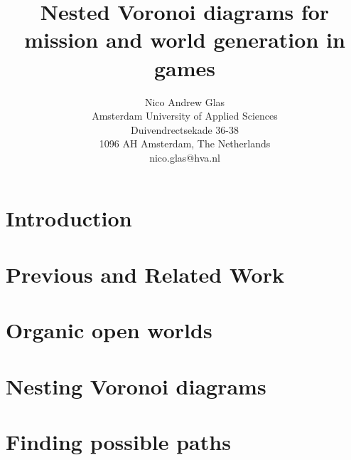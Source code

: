 \documentclass[9pt,a4paper,twocolumn,draft]{article}
\title{\textbf{Nested Voronoi diagrams for mission and world generation in games }}
\author{ \small Nico Andrew Glas \\ \small Amsterdam University of Applied Sciences \\ \small Duivendrectsekade 36-38 \\ \small 1096 AH Amsterdam, The Netherlands \\ \small nico.glas@hva.nl}
\begin{document}
\maketitle  

\begin{abstract}

\end{abstract}

\section{Introduction}


\section{Previous and Related Work}

\section{Organic open worlds}

\section{Nesting Voronoi diagrams}

\section{Finding possible paths}
\end{document}
